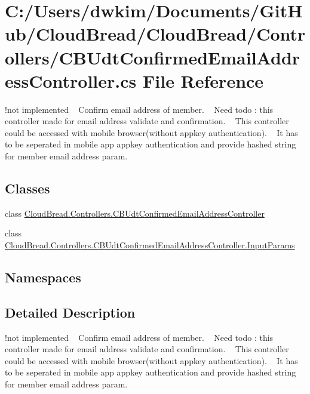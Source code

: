 \hypertarget{a00227}{}\section{C\+:/\+Users/dwkim/\+Documents/\+Git\+Hub/\+Cloud\+Bread/\+Cloud\+Bread/\+Controllers/\+C\+B\+Udt\+Confirmed\+Email\+Address\+Controller.cs File Reference}
\label{a00227}


!not implemented ~\newline
Confirm email address of member. ~\newline
Need todo \+: this controller made for email address validate and confirmation. ~\newline
This controller could be accessed with mobile browser(without appkey authentication). ~\newline
It has to be seperated in mobile app appkey authentication and provide hashed string for member email address param. ~\newline
 


\subsection*{Classes}
\begin{DoxyCompactItemize}
\item 
class \hyperlink{a00056}{Cloud\+Bread.\+Controllers.\+C\+B\+Udt\+Confirmed\+Email\+Address\+Controller}
\item 
class \hyperlink{a00105}{Cloud\+Bread.\+Controllers.\+C\+B\+Udt\+Confirmed\+Email\+Address\+Controller.\+Input\+Params}
\end{DoxyCompactItemize}
\subsection*{Namespaces}
\begin{DoxyCompactItemize}
\end{DoxyCompactItemize}


\subsection{Detailed Description}
!not implemented ~\newline
Confirm email address of member. ~\newline
Need todo \+: this controller made for email address validate and confirmation. ~\newline
This controller could be accessed with mobile browser(without appkey authentication). ~\newline
It has to be seperated in mobile app appkey authentication and provide hashed string for member email address param. ~\newline


